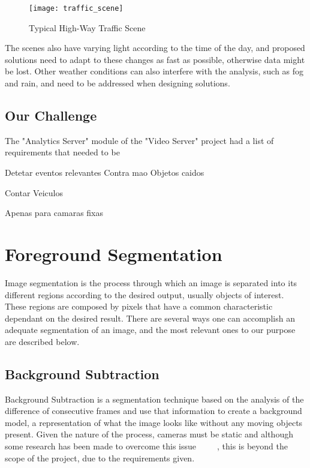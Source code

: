 \begin{figure}[h]
  \begin{center}
    \leavevmode
    \texttt{[image: traffic\_scene]}
    \caption{Typical High-Way Traffic Scene}
    \label{fig:hh_traffic}
  \end{center}
\end{figure}

The scenes also have varying light according to the time of the day, and proposed solutions need to adapt to these changes as fast as possible, otherwise data might be lost. Other weather conditions can also interfere with the analysis, such as fog and rain, and need to be addressed when designing solutions.

\subsection{Our Challenge}

The "Analytics Server" module of the "Video Server" project had a list of requirements that needed to be 

Detetar eventos relevantes
	Contra mao
	Objetos caidos

Contar Veiculos

Apenas para camaras fixas


\section{Foreground Segmentation}

Image segmentation is the process through which  an image is separated into its different regions according to the desired output, usually objects of interest. These regions are composed by pixels that have a common characteristic ~\cite{shapiro_computer_2001} dependant on the desired result. There are several ways one can accomplish an adequate segmentation of an image, and the most relevant ones to our purpose are described below.

\subsection{Background Subtraction}

Background Subtraction is a segmentation technique based on the analysis of the difference of consecutive frames and use that information to create a background model, a representation of what the image looks like without any moving objects present. Given the nature of the process, cameras must be static and although some research has been made to overcome this issue ~\cite{li_detection_2012} ~\cite{sheikh_background_2009} ~\cite{zamalieva_background_2014}, this is beyond the scope of the project, due to the requirements given.

